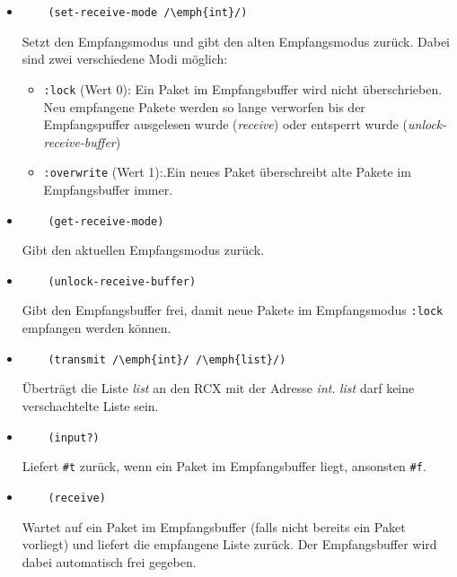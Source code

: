 \documentclass[12pt,a4paper]{article}
\begin{document}
\begin{itemize}
\item
  \begin{lstlisting}
    (set-receive-mode /\emph{int}/)
  \end{lstlisting}
  Setzt den Empfangsmodus und gibt den alten Empfangsmodus zur\"uck. 
  Dabei sind zwei verschiedene Modi m\"oglich:
  \begin{itemize}
  \item \verb+:lock+ (Wert 0): Ein Paket im Empfangsbuffer wird nicht 
    \"uberschrieben. Neu empfangene Pakete werden so lange
    verworfen bis der Empfangspuffer ausgelesen wurde (\emph{receive}) oder
    entsperrt wurde (\emph{unlock-receive-buffer})
  \item \verb+:overwrite+ (Wert 1):.Ein neues Paket \"uberschreibt
    alte Pakete im Empfangsbuffer immer.
  \end{itemize}
\item
  \begin{lstlisting}
    (get-receive-mode)
  \end{lstlisting}
  Gibt den aktuellen Empfangsmodus zur\"uck.
\item
  \begin{lstlisting}
    (unlock-receive-buffer)
  \end{lstlisting}
  Gibt den Empfangsbuffer frei, damit neue Pakete im Empfangsmodus \verb+:lock+
  empfangen werden k\"onnen.
\item
  \begin{lstlisting}
    (transmit /\emph{int}/ /\emph{list}/)
  \end{lstlisting}
  \"Ubertr\"agt die Liste \emph{list} an den RCX mit der Adresse \emph{int}.
  \emph{list} darf keine verschachtelte Liste sein.
\item
  \begin{lstlisting}
    (input?)
  \end{lstlisting}
  Liefert \verb+#t+ zur\"uck, wenn ein Paket im Empfangsbuffer liegt, ansonsten
  \verb+#f+.
\item
  \begin{lstlisting}
    (receive)
  \end{lstlisting}
  Wartet auf ein Paket im Empfangsbuffer (falls nicht bereits ein Paket vorliegt) und
  liefert die empfangene Liste zur\"uck. Der Empfangsbuffer wird dabei automatisch frei
  gegeben.
\end{itemize}
\end{document}
